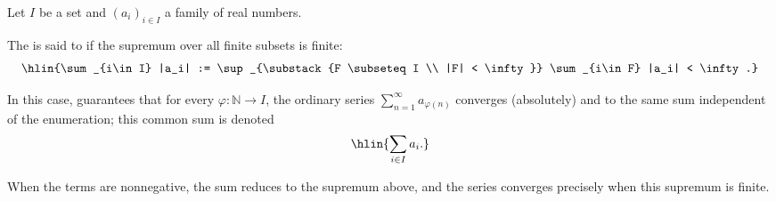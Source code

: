 \begin{definition} \label{definition:series_indexed_by_a_countable_set}
    Let $I$ be a  set and $(a_i)_{i\in I}$ a family of real numbers.

    The  is said to  if the supremum over all finite subsets is finite:
    $$\hlin{\sum_{i\in I} |a_i| := \sup_{\substack{F \subseteq I \\ |F| < \infty}} \sum_{i\in F} |a_i| < \infty.}$$

    In this case,  guarantees that for every  $\varphi : \mathbb{N} \to I$, the ordinary series $\sum_{n=1}^\infty a_{\varphi(n)}$ converges (absolutely) and to the same sum independent of the enumeration; this common sum is denoted
    $$\hlin{\sum_{i\in I} a_i.}$$

    When the terms are nonnegative, the sum reduces to the supremum above, and the series converges precisely when this supremum is finite.
\end{definition}